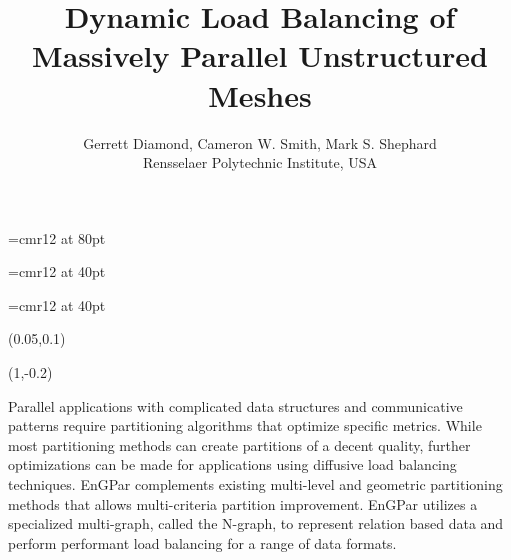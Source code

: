 \documentclass{beamer}
\begin{document}
\font\titlefont=cmr12 at 80pt
\title[Load Balancing of Unstructured Meshes]
{\titlefont
  Dynamic Load Balancing of \\[0.3cm]Massively Parallel Unstructured Meshes
}
\font\authorfont=cmr12 at 40pt
\author[G. Diamond]{\authorfont
  Gerrett Diamond, Cameron W. Smith, Mark S. Shephard\\
  Rensselaer Polytechnic Institute, USA}
\date{}
\font\abstractfont=cmr12 at 40pt
\begin{textblock}{15.8}(0.05,0.1)
  \titlepage
  \begin{textblock}{14}(1,-0.2)
    \begin{block}{}
      \begin{center}
      \abstractfont
      Parallel applications with complicated data structures and communicative patterns require partitioning algorithms that optimize specific metrics. While most partitioning methods can create partitions of a decent quality, further optimizations can be made for applications using diffusive load balancing techniques. EnGPar complements existing multi-level and geometric partitioning methods that allows multi-criteria partition improvement. EnGPar utilizes a specialized multi-graph, called the N-graph, to represent relation based data and perform performant load balancing for a range of data formats.
              
      \end{center}
    \end{block}
  \end{textblock}
\end{textblock}
\end{document}
